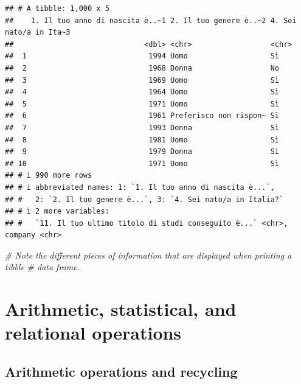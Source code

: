 \documentclass[
]{book}
\newenvironment{Shaded}{\begin{snugshade}}{\end{snugshade}}
\newcommand{\CommentTok}[1]{\textcolor[rgb]{0.56,0.35,0.01}{\textit{#1}}}
\begin{document}
\begin{verbatim}
## # A tibble: 1,000 x 5
##    1. Il tuo anno di nascita è..~1 2. Il tuo genere è..~2 4. Sei nato/a in Ita~3
##                              <dbl> <chr>                  <chr>                 
##  1                            1994 Uomo                   Sì                    
##  2                            1968 Donna                  No                    
##  3                            1969 Uomo                   Sì                    
##  4                            1964 Uomo                   Sì                    
##  5                            1971 Uomo                   Sì                    
##  6                            1961 Preferisco non rispon~ Sì                    
##  7                            1993 Donna                  Sì                    
##  8                            1981 Uomo                   Sì                    
##  9                            1979 Donna                  Sì                    
## 10                            1971 Uomo                   Sì                    
## # i 990 more rows
## # i abbreviated names: 1: `1. Il tuo anno di nascita è...`,
## #   2: `2. Il tuo genere è...`, 3: `4. Sei nato/a in Italia?`
## # i 2 more variables:
## #   `11. Il tuo ultimo titolo di studi conseguito è...` <chr>, company <chr>
\end{verbatim}

\begin{Shaded}
\begin{Highlighting}[]
\CommentTok{\# Note the different pieces of information that are displayed when printing a tibble}
\CommentTok{\# data frame.}
\end{Highlighting}
\end{Shaded}

\hypertarget{arithmetic-statistical-and-relational-operations}{%
\section{Arithmetic, statistical, and relational operations}\label{arithmetic-statistical-and-relational-operations}}

\hypertarget{arithmetic-operations-and-recycling}{%
\subsection{Arithmetic operations and recycling}\label{arithmetic-operations-and-recycling}}
\end{document}
